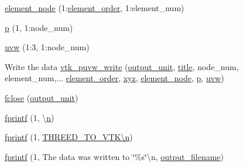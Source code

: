 \begin{DoxyCompactItemize}
\hyperlink{a00611_a50df015479692caa32ea5ed86939881e}{element\+\_\+node} (1\+:\hyperlink{a00611_aa77ee84ffb15118601acbd018f243edc}{element\+\_\+order}, 1\+:element\+\_\+num)
\item 
\hyperlink{a00611_a1e0420801cd5156c14e085b87a4945f5}{p} (1, 1\+:node\+\_\+num)
\item 
\hyperlink{a00611_ac062c50cc1b43901b7ea410ae1ff3be9}{uvw} (1\+:3, 1\+:node\+\_\+num)
\item 
Write the data \hyperlink{a00611_a820b061ee96c178a7c94b48c0189d2ef}{vtk\+\_\+puvw\+\_\+write} (\hyperlink{a00614_a21b113ecd24e6ae8a92fa4a149ad8701}{output\+\_\+unit}, \hyperlink{a00617_a051e403214cb6872ad3fe4e50302a6ee}{title}, node\+\_\+num, element\+\_\+num,... \hyperlink{a00611_aa77ee84ffb15118601acbd018f243edc}{element\+\_\+order}, \hyperlink{a00614_a6444a221e6b74abaf6d67d44af2650a0}{xyz}, \hyperlink{a00614_a50df015479692caa32ea5ed86939881e}{element\+\_\+node}, \hyperlink{a00614_a1e0420801cd5156c14e085b87a4945f5}{p}, \hyperlink{a00614_ac062c50cc1b43901b7ea410ae1ff3be9}{uvw})
\item 
\hyperlink{a00611_a5b2ddd49b09b4e4843a4643822a0272a}{fclose} (\hyperlink{a00614_a21b113ecd24e6ae8a92fa4a149ad8701}{output\+\_\+unit})
\item 
\hyperlink{a00611_a8e4a0930102fdc798344d4c081733707}{fprintf} (1, \textquotesingle{}\textbackslash{}\hyperlink{a00623_a781a04ab095280f838ff3eb0e51312e0}{n}\textquotesingle{})
\item 
\hyperlink{a00611_a846f7f5db5b0a0d12adc1faa7fe0b39c}{fprintf} (1, \textquotesingle{}\hyperlink{a00623_a781a04ab095280f838ff3eb0e51312e0}{T\+H\+R\+E\+E\+D\+\_\+\+T\+O\+\_\+\+V\+T\+K\textbackslash{}n}\textquotesingle{})
\item 
\hyperlink{a00611_aa03f4dd94e9e9937e919c581062a7319}{fprintf} (1, \textquotesingle{} The data was written to \char`\"{}\%s\char`\"{}\textbackslash{}n\textquotesingle{}, \hyperlink{a00617_a5934d690c688edbd92210f38fe5855e7}{output\+\_\+filename})
\item 

\end{DoxyCompactItemize}
